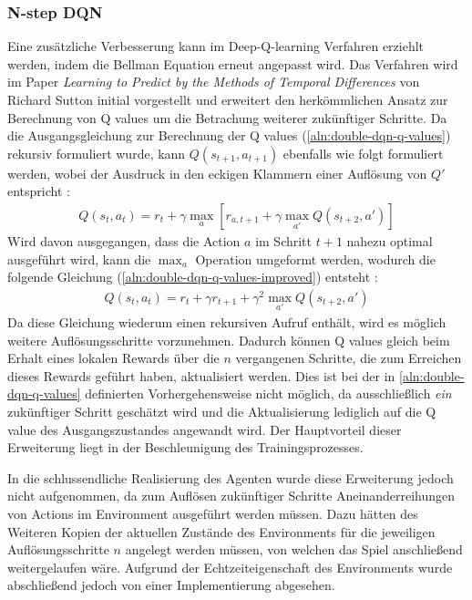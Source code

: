 \documentclass[11pt]{scrartcl}
\begin{document}
\subsubsection{N-step DQN} %
Eine zusätzliche Verbesserung kann im Deep-Q-learning Verfahren erziehlt werden, indem die
Bellman Equation erneut angepasst wird. Das Verfahren wird im Paper \textit{Learning to
Predict by the Methods of Temporal Differences} von Richard Sutton\cite{S1988} initial
vorgestellt und erweitert den herkömmlichen Ansatz zur Berechnung von Q values um die
Betrachung weiterer zukünftiger Schritte. Da die Ausgangsgleichung zur Berechnung der Q
values (\ref{aln:double-dqn-q-values}) rekursiv formuliert wurde, kann $Q(s_{t+1},
a_{t+1})$ ebenfalls wie folgt formuliert werden, wobei der Ausdruck in den eckigen
Klammern einer Auflösung von $Q'$ entspricht \cite[~S.168]{L2018}:
\begin{align}
Q(s_t, a_t) = r_t + \gamma \max_{a}[r_{a,t+1}+\gamma\max_{a'}Q(s_{t+2},a')]
\label{aln:double-dqn-q-values-improved}
\end{align}
Wird davon ausgegangen, dass die Action $a$ im Schritt $t+1$ nahezu optimal ausgeführt wird,
kann die $\max_{a}$ Operation umgeformt werden, wodurch die folgende Gleichung
(\ref{aln:double-dqn-q-values-improved}) entsteht \cite[~S.168]{L2018}:
\begin{align}
Q(s_t, a_t) = r_t + \gamma r_{t+1}+\gamma^2 \max_{a'}Q(s_{t+2},a')
\label{aln:double-dqn-q-values-improved}
\end{align}
Da diese Gleichung wiederum einen rekursiven Aufruf enthält, wird es möglich weitere
Auflösungsschritte vorzunehmen. Dadurch können Q values gleich beim Erhalt eines lokalen
Rewards über die $n$ vergangenen Schritte, die zum Erreichen dieses Rewards geführt haben,
aktualisiert werden. Dies ist bei der in \autoref{aln:double-dqn-q-values} definierten
Vorhergehensweise nicht möglich, da ausschließlich \textit{ein} zukünftiger Schritt geschätzt
wird und die Aktualisierung lediglich auf die Q value des Ausgangszustandes angewandt wird. 
Der Hauptvorteil dieser Erweiterung liegt in der Beschleunigung des Trainingsprozesses.

In die schlussendliche Realisierung des Agenten wurde diese Erweiterung jedoch nicht
aufgenommen, da zum Auflösen zukünftiger Schritte Aneinanderreihungen von Actions im
Environment ausgeführt werden müssen. Dazu hätten des Weiteren Kopien der aktuellen
Zustände des Environments für die jeweiligen Auflösungsschritte $n$ angelegt werden
müssen, von welchen das Spiel anschließend weitergelaufen wäre. Aufgrund der
Echtzeiteigenschaft des Environments wurde abschließend jedoch von einer Implementierung
abgesehen.
\end{document}
